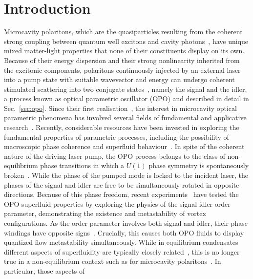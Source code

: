 \chapter{Introduction}

Microcavity polaritons, which are the quasiparticles resulting from
the coherent strong coupling between quantum well excitons and cavity
photons~\cite{9780199228942}, have unique mixed matter-light
properties that none of their constituents display on its own.
Because of their energy dispersion and their strong nonlinearity
inherited from the excitonic components, polaritons continuously
injected by an external laser into a pump state with suitable
wavevector and energy can undergo coherent stimulated scattering into
two conjugate states~\cite{Ciuti_2000,Ciuti_2001,Ciuti_2003}, namely
the signal and the idler, a process known as optical parametric
oscillator (OPO) and described in detail in Sec.~\ref{sec:opo}.
%
Since their first realisation~\cite{Stevenson_2000, Savvidis_2000,
Savvidis_2000_b, Baumberg_2000, Saba_2001}, the interest in
microcavity optical parametric phenomena has involved several fields
of fundamental and applicative research~\cite{Edamatsu_2004,
Savasta_2005, Lanco_2006, Abbarchi_2011, Ardizzone_2012, Xie_2012,
Lecomte_2013}.
%
Recently, considerable resources have been invested in exploring the
fundamental properties of parametric processes, including the
possibility of macroscopic phase coherence and superfluid
behaviour~\cite{Carusotto_2013}.  In spite of the coherent nature of
the driving laser pump, the OPO process belongs to the class of
non-equilibrium phase transitions in which a $U(1)$ phase symmetry is
spontaneously broken~\cite{Wouters_2007}.  While the phase of the
pumped mode is locked to the incident laser, the phases of the signal
and idler are free to be simultaneously rotated in opposite
directions.  Because of this phase freedom, recent
experiments~\cite{Sanvitto_2010} have tested the OPO superfluid
properties by exploring the physics of the signal-idler order
parameter, demonstrating the existence and metastability of vortex
configurations. As the order parameter involves both signal and idler,
their phase windings have opposite
signs~\cite{Sanvitto_2010,Marchetti_2010,9783642241857}. Crucially,
this causes both OPO fluids to display quantized flow metastability
simultaneously.
%
While in equilibrium condensates different aspects of superfluidity
are typically closely related~\cite{Leggett_1999}, this is no longer
true in a non-equilibrium context such as for microcavity
polaritons~\cite{Carusotto_2013}.  In particular, those aspects of

